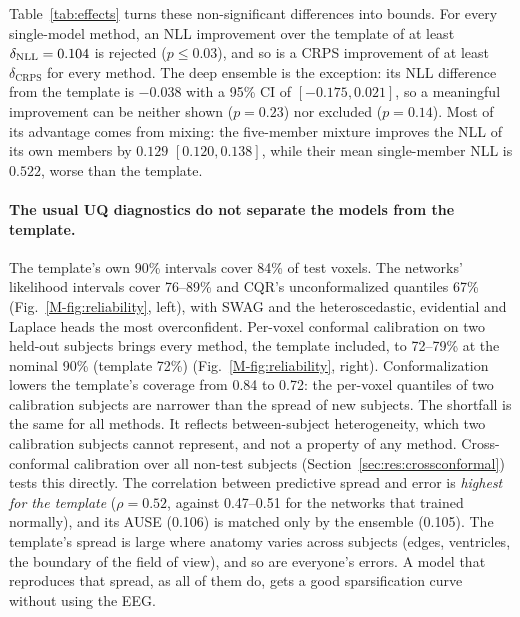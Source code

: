 Table~\ref{tab:effects} turns these non-significant differences into bounds. For every single-model method, an NLL improvement over the template of at least $\delta_{\mathrm{NLL}}=0.104$ is rejected ($p\le0.03$), and so is a CRPS improvement of at least $\delta_{\mathrm{CRPS}}$ for every method. The deep ensemble is the exception: its NLL difference from the template is $-0.038$ with a 95\% CI of $[-0.175, 0.021]$, so a meaningful improvement can be neither shown ($p=0.23$) nor excluded ($p=0.14$). Most of its advantage comes from mixing: the five-member mixture improves the NLL of its own members by $0.129$ $[0.120, 0.138]$, while their mean single-member NLL is $0.522$, worse than the template.

\paragraph{The usual UQ diagnostics do not separate the models from the template.} The template's own 90\% intervals cover 84\% of test voxels. The networks' likelihood intervals cover 76--89\% and CQR's unconformalized quantiles 67\% (Fig.~\ref{M-fig:reliability}, left), with SWAG and the heteroscedastic, evidential and Laplace heads the most overconfident. Per-voxel conformal calibration on two held-out subjects brings every method, the template included, to 72--79\% at the nominal 90\% (template 72\%) (Fig.~\ref{M-fig:reliability}, right). Conformalization lowers the template's coverage from 0.84 to 0.72: the per-voxel quantiles of two calibration subjects are narrower than the spread of new subjects. The shortfall is the same for all methods. It reflects between-subject heterogeneity, which two calibration subjects cannot represent, and not a property of any method. Cross-conformal calibration over all non-test subjects (Section~\ref{sec:res:crossconformal}) tests this directly. The correlation between predictive spread and error is \emph{highest for the template} ($\rho=0.52$, against 0.47--0.51 for the networks that trained normally), and its AUSE (0.106) is matched only by the ensemble (0.105). The template's spread is large where anatomy varies across subjects (edges, ventricles, the boundary of the field of view), and so are everyone's errors. A model that reproduces that spread, as all of them do, gets a good sparsification curve without using the EEG.



